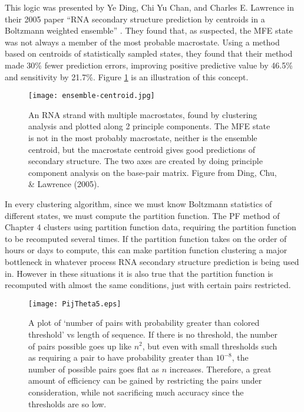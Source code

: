 This logic was presented by Ye Ding, Chi Yu Chan, and Charles
E. Lawrence in their 2005 paper ``RNA secondary structure prediction
by centroids in a Boltzmann weighted ensemble''
\cite{ding2005rna}. They found that, as suspected, the MFE state
was not always a member of the most probable macrostate. Using a
method based on centroids of statistically sampled states, they found
that their method made 30\% fewer prediction errors, improving
positive predictive value by 46.5\% and sensitivity by 21.7\%. Figure
\ref{fig:centroidFig} is an illustration of this concept.
\begin{figure}[t]
\centering
\texttt{[image: ensemble-centroid.jpg]}
\caption[Clustering analysis]{An RNA strand with multiple macrostates, found by clustering
  analysis and plotted along 2 principle components. The MFE state is
  not in the most probably macrostate, neither is the ensemble
  centroid, but the macrostate centroid gives good predictions of
  secondary structure. The two axes are created by doing principle
  component analysis on the base-pair matrix. Figure from Ding, Chu,
  \& Lawrence (2005).}
\label{fig:centroidFig}
\end{figure}

In every clustering algorithm, since we must know Boltzmann statistics
of different states, we must compute the partition function. The PF
method of Chapter 4 clusters using partition function data, requiring
the partition function to be recomputed several times. If the
partition function takes on the order of hours or days to compute,
this can make partition function clustering a major bottleneck in
whatever process RNA secondary structure prediction is being used
in. However in these situations it is also true that the partition
function is recomputed with almost the same conditions, just with
certain pairs restricted.

\begin{figure}[t]
\centering
\texttt{[image: PijTheta5.eps]} 
\caption[Number of probable pairs above threshold $\theta$]{A plot of
  `number of pairs with probability greater than colored threshold'
  vs length of sequence. If there is no threshold, the number of pairs
  possible goes up like $n^2$, but even with small thresholds such as
  requiring a pair to have probability greater than $10^{-8}$, the
  number of possible pairs goes flat as $n$ increases. Therefore, a
  great amount of efficiency can be gained by restricting the pairs
  under consideration, while not sacrificing much accuracy since the
  thresholds are so low. }
\label{fig:probThresh}
\end{figure}

